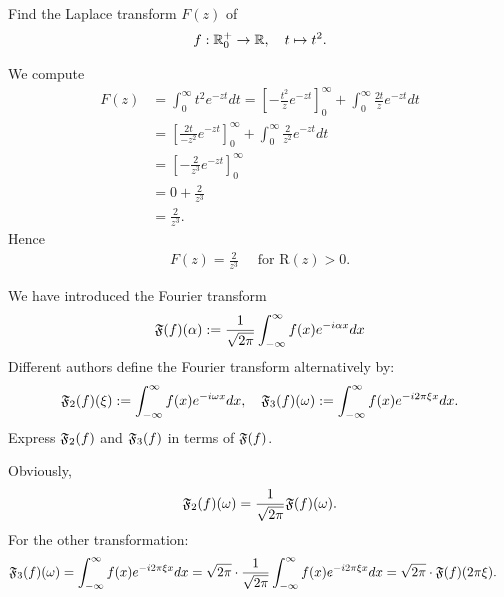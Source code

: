 \documentclass[11pt]{article}
\begin{document}
\begin{exercise}
    Find the Laplace transform $F(z)$ of 
    \begin{align*}
        f : \mathbb{R}_{0}^{+} \to \mathbb{R}, \quad t \mapsto t^{2}.
    \end{align*}
\end{exercise}
\begin{solution}     
We compute 
\begin{align*}
    F(z)&=\int_0^{\infty} t^2 e^{-z t} d t=\left[-\frac{t^2}{z} e^{-z t}\right]_0^{\infty}+\int_0^{\infty} \frac{2 t}{z} e^{-z t} d t \\ &=\left[\frac{2 t}{-z^2} e^{-z t}\right]_0^{\infty}+\int_0^{\infty} \frac{2}{z^2} e^{-z t} d t \\ &=\left[-\frac{2}{z^3} e^{-z t}\right]_0^{\infty} \\ &=0+\frac{2}{z^3} \\ &=\frac{2}{z^3}
    .
\end{align*}
Hence 
\begin{align*}
    F(z)=\frac{2}{z^3} \quad \text { for } \mathrm{R}(z)>0.
\end{align*}
\end{solution}

\begin{exercise}[Extra]
    We have introduced the Fourier transform 
    \begin{align*}
        \mathfrak{F}(f)(\alpha) := \frac{1}{\sqrt{2\pi}}\int_{-\infty}^{\infty} f(x) e^{-i \alpha x} dx
    \end{align*}
    Different authors define the Fourier transform alternatively by:
    \begin{align*}
        \mathfrak{F}_2(f)(\xi) 
        := \int_{-\infty}^{\infty} f(x) e^{-i \omega x} dx
        ,
        \quad 
        \mathfrak{F}_3(f)(\omega) 
        := \int_{-\infty}^{\infty} f(x) e^{-i 2\pi \xi x} dx
        .
    \end{align*}
    Express $\mathfrak{F}_{2}(f)$ and $\mathfrak{F}_{3}(f)$ in terms of $\mathfrak{F}(f)$.
\end{exercise}
\begin{solution}    
    Obviously, 
    \begin{align*}
        \mathfrak{F}_{2}(f)(\omega) = \frac{1}{\sqrt{2\pi}} \mathfrak{F}(f)(\omega).
    \end{align*}
    For the other transformation:
    \begin{align*}
        \mathfrak{F}_3(f)(\omega) 
        &
        = 
        \int_{-\infty}^{\infty} f(x) e^{-i 2\pi \xi x} dx
        = 
        \sqrt{2\pi} 
        \cdot 
        \frac{1}{\sqrt{2\pi}}
        \int_{-\infty}^{\infty} f(x) e^{-i 2\pi \xi x} dx
        = 
        \sqrt{2\pi} 
        \cdot 
        \mathfrak{F}(f)( 2\pi \xi )
        .
    \end{align*}
\end{solution}
\end{document}
